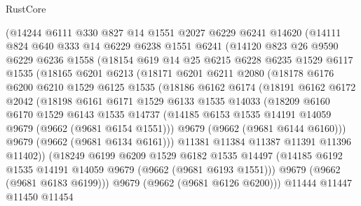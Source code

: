 \begin{lexlean}{RustCore}
\begin{coremodule}
      (@14244
        @6111
        @330
        @827
        @14
        @1551
        @2027
        @6229
        @6241
        @14620
        (@14111
          @824
          @640
          @333
          @14
          @6229
          @6238
          @1551
          @6241
          (@14120
            @823
            @26
            @9590
            @6229
            @6236
            @1558
            (@18154
              @619
              @14
              @25
              @6215
              @6228
              @6235
              @1529
              @6117
              @1535
              (@18165
                @6201
                @6213
                (@18171
                  @6201
                  @6211
                  @2080
                  (@18178
                    @6176
                    @6200
                    @6210
                    @1529
                    @6125
                    @1535
                    (@18186
                      @6162
                      @6174
                      (@18191
                        @6162
                        @6172
                        @2042
                        (@18198
                          @6161
                          @6171
                          @1529
                          @6133
                          @1535
                          @14033
                          (@18209
                            @6160
                            @6170
                            @1529
                            @6143
                            @1535
                            @14737
                            (@14185 @6153 @1535 @14191 @14059 @9679 (@9662 (@9681 @6154 @1551)))
                            @9679
                            (@9662 (@9681 @6144 @6160)))
                          @9679
                          (@9662 (@9681 @6134 @6161)))
                        @11381
                        @11384
                        @11387
                        @11391
                        @11396
                        @11402))
                    (@18249
                      @6199
                      @6209
                      @1529
                      @6182
                      @1535
                      @14497
                      (@14185 @6192 @1535 @14191 @14059 @9679 (@9662 (@9681 @6193 @1551)))
                      @9679
                      (@9662 (@9681 @6183 @6199)))
                    @9679
                    (@9662 (@9681 @6126 @6200)))
                  @11444
                  @11447
                  @11450
                  @11454

\end{coremodule}
\end{lexlean}
